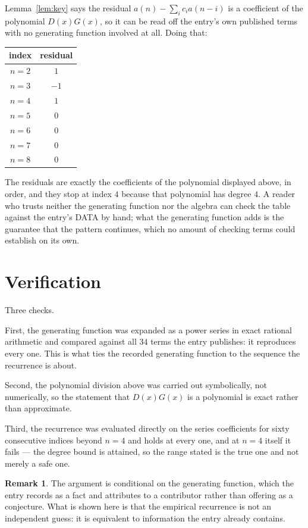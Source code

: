 \documentclass[11pt,a4paper]{article}
\theoremstyle{plain}
\theoremstyle{definition}
\newtheorem{remark}[theorem]{Remark}
\begin{document}
Lemma~\ref{lem:key} says the residual $a(n)-\sum_ic_ia(n-i)$ is a coefficient of the
polynomial $D(x)G(x)$, so it can be read off the entry's own published terms with no
generating function involved at all. Doing that:
\begin{center}
\begin{tabular}{cc}
index & residual \\ \hline
$n=2$ & $1$ \\
$n=3$ & $-1$ \\
$n=4$ & $1$ \\
$n=5$ & $0$ \\
$n=6$ & $0$ \\
$n=7$ & $0$ \\
$n=8$ & $0$
\end{tabular}
\end{center}
The residuals are exactly the coefficients of the polynomial displayed above, in order, and
they stop at index $4$ because that polynomial has degree $4$. A reader who trusts
neither the generating function nor the algebra can check the table against the entry's DATA
by hand; what the generating function adds is the guarantee that the pattern continues, which
no amount of checking terms could establish on its own.

\section{Verification}

Three checks.

First, the generating function was expanded as a power series in exact rational arithmetic and
compared against all $34$ terms the entry publishes: it reproduces every one. This is
what ties the recorded generating function to the sequence the recurrence is about.

Second, the polynomial division above was carried out symbolically, not numerically, so the
statement that $D(x)G(x)$ is a polynomial is exact rather than approximate.

Third, the recurrence was evaluated directly on the series coefficients for sixty consecutive
indices beyond $n=4$ and holds at every one, and at $n=4$ itself it fails --- the
degree bound is attained, so the range stated is the true one and not merely a safe one.

\begin{remark}
The argument is conditional on the generating function, which the entry records as a fact and
attributes to a contributor rather than offering as a conjecture. What is shown here is that
the empirical recurrence is not an independent guess: it is equivalent to information the
entry already contains.
\end{remark}
\end{document}
